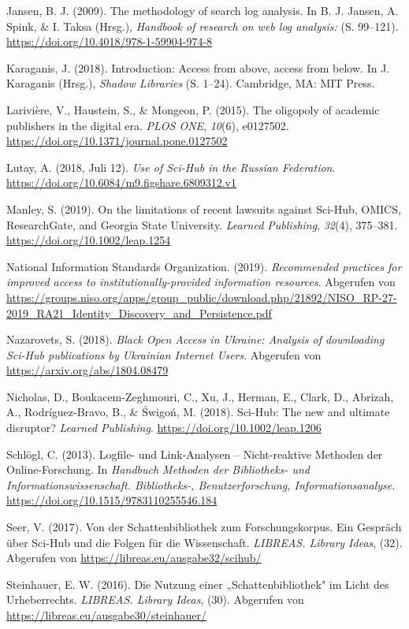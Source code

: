 \documentclass[a4paper,
fontsize=11pt,
oneside,
numbers=noperiodatend,
parskip=half-,
bibliography=totoc,
final
]{scrartcl}
\begin{document}
Jansen, B. J. (2009). The methodology of search log analysis. In B. J.
Jansen, A. Spink, \& I. Taksa (Hrsg.), \emph{Handbook of research on web
log analysis:} (S. 99--121).
\url{https://doi.org/10.4018/978-1-59904-974-8}

Karaganis, J. (2018). Introduction: Access from above, access from
below. In J. Karaganis (Hrsg.), \emph{Shadow Libraries} (S. 1--24).
Cambridge, MA: MIT Press.

Larivière, V., Haustein, S., \& Mongeon, P. (2015). The oligopoly of
academic publishers in the digital era. \emph{PLOS ONE}, \emph{10}(6),
e0127502. \url{https://doi.org/10.1371/journal.pone.0127502}

Lutay, A. (2018, Juli 12). \emph{Use of Sci-Hub in the Russian
Federation}. \url{https://doi.org/10.6084/m9.figshare.6809312.v1}

Manley, S. (2019). On the limitations of recent lawsuits against
Sci-Hub, OMICS, ResearchGate, and Georgia State University.
\emph{Learned Publishing}, \emph{32}(4), 375--381.
\url{https://doi.org/10.1002/leap.1254}

National Information Standards Organization. (2019). \emph{Recommended
practices for improved access to institutionally-provided information
resources}. Abgerufen von
\url{https://groups.niso.org/apps/group_public/download.php/21892/NISO_RP-27-2019_RA21_Identity_Discovery_and_Persistence.pdf}

Nazarovets, S. (2018). \emph{Black Open Access in Ukraine: Analysis of
downloading Sci-Hub publications by Ukrainian Internet Users}. Abgerufen
von \url{https://arxiv.org/abs/1804.08479}

Nicholas, D., Boukacem-Zeghmouri, C., Xu, J., Herman, E., Clark, D.,
Abrizah, A., Rodríguez-Bravo, B., \& Świgoń, M. (2018). Sci-Hub: The new
and ultimate disruptor? \emph{Learned Publishing}.
\url{https://doi.org/10.1002/leap.1206}

Schlögl, C. (2013). Logfile- und Link-Analysen -- Nicht-reaktive
Methoden der Online-Forschung. In \emph{Handbuch Methoden der
Bibliotheks- und Informationswissenschaft. Bibliotheks-,
Benutzerforschung, Informationsanalyse}.
\url{https://doi.org/10.1515/9783110255546.184}

Seer, V. (2017). Von der Schattenbibliothek zum Forschungskorpus. Ein
Gespräch über Sci-Hub und die Folgen für die Wissenschaft.
\emph{LIBREAS. Library Ideas}, (32). Abgerufen von
\url{https://libreas.eu/ausgabe32/scihub/}

Steinhauer, E. W. (2016). Die Nutzung einer „Schattenbibliothek" im
Licht des Urheberrechts. \emph{LIBREAS. Library Ideas}, (30). Abgerufen
von \url{https://libreas.eu/ausgabe30/steinhauer/}
\end{document}
